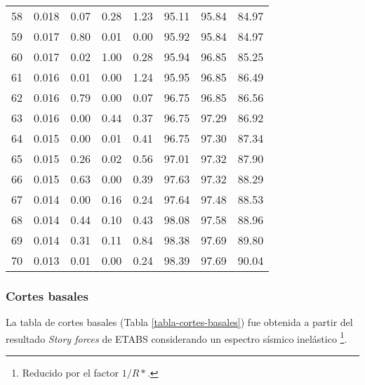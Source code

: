\begin{longtable}{cccccccc}
    58    & 0.018 & 0.07  & 0.28  & 1.23  & 95.11 & 95.84 & 84.97 \\
    59    & 0.017 & 0.80  & 0.01  & 0.00  & 95.92 & 95.84 & 84.97 \\
    60    & 0.017 & 0.02  & 1.00  & 0.28  & 95.94 & 96.85 & 85.25 \\
    61    & 0.016 & 0.01  & 0.00  & 1.24  & 95.95 & 96.85 & 86.49 \\
    62    & 0.016 & 0.79  & 0.00  & 0.07  & 96.75 & 96.85 & 86.56 \\
    63    & 0.016 & 0.00  & 0.44  & 0.37  & 96.75 & 97.29 & 86.92 \\
    64    & 0.015 & 0.00  & 0.01  & 0.41  & 96.75 & 97.30 & 87.34 \\
    65    & 0.015 & 0.26  & 0.02  & 0.56  & 97.01 & 97.32 & 87.90 \\
    66    & 0.015 & 0.63  & 0.00  & 0.39  & 97.63 & 97.32 & 88.29 \\
    67    & 0.014 & 0.00  & 0.16  & 0.24  & 97.64 & 97.48 & 88.53 \\
    68    & 0.014 & 0.44  & 0.10  & 0.43  & 98.08 & 97.58 & 88.96 \\
    69    & 0.014 & 0.31  & 0.11  & 0.84  & 98.38 & 97.69 & 89.80 \\
    70    & 0.013 & 0.01  & 0.00  & 0.24  & 98.39 & 97.69 & 90.04 \\
\hline
\end{longtable}

\newpage
\subsubsection{Cortes basales}

La tabla de cortes basales (Tabla \ref{tabla-cortes-basales}) fue obtenida a partir del resultado \textit{Story forces} de ETABS considerando un espectro sísmico inelástico \footnote{Reducido por el factor $1/R*$.}.

